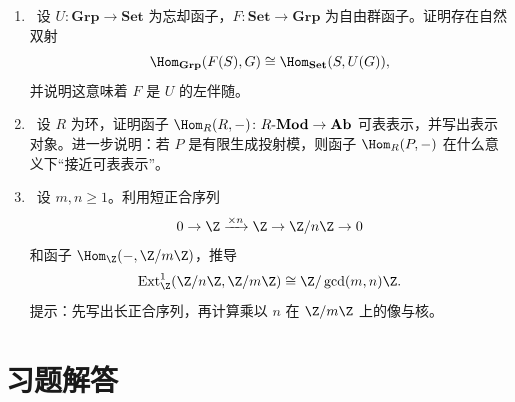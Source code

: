 \begin{enumerate}[resume, label=\textbf{习题A.\arabic*}, leftmargin=3.5em]
  \item \hard\ 设 $U\colon \mathbf{Grp}\to \mathbf{Set}$ 为忘却函子，$F\colon \mathbf{Set}\to \mathbf{Grp}$ 为自由群函子。证明存在自然双射
  \[
    \Hom_{\mathbf{Grp}}(F(S),G)\cong \Hom_{\mathbf{Set}}(S,U(G)),
  \]
  并说明这意味着 $F$ 是 $U$ 的左伴随。

  \item \hard\ 设 $R$ 为环，证明函子 $\Hom_R(R,-)\colon R\text{-}\mathbf{Mod}\to \mathbf{Ab}$ 可表表示，并写出表示对象。进一步说明：若 $P$ 是有限生成投射模，则函子 $\Hom_R(P,-)$ 在什么意义下“接近可表表示”。

  \item \hard\ 设 $m,n\ge 1$。利用短正合序列
  \[
    0\to \Z \xrightarrow{\times n} \Z \to \Z/n\Z \to 0
  \]
  和函子 $\Hom_{\Z}(-,\Z/m\Z)$，推导
  \[
    \mathrm{Ext}^1_{\Z}(\Z/n\Z,\Z/m\Z)\cong \Z/\gcd(m,n)\Z.
  \]
  提示：先写出长正合序列，再计算乘以 $n$ 在 $\Z/m\Z$ 上的像与核。
\end{enumerate}

\section*{习题解答}

